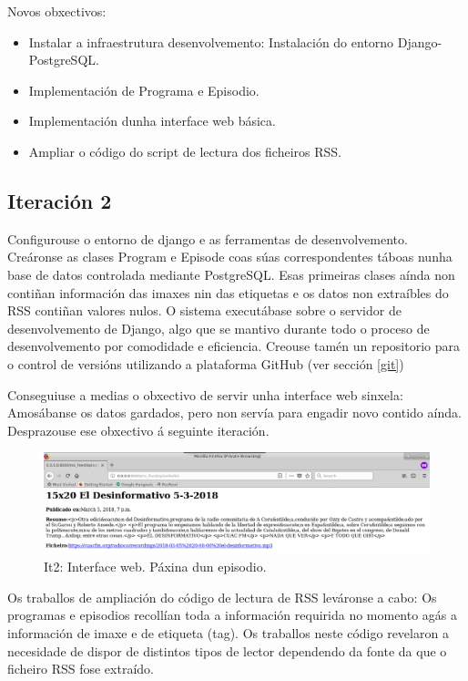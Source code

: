 Novos obxectivos:

\begin{itemize}
	\item Instalar a infraestrutura desenvolvemento: Instalación do entorno Django-PostgreSQL.
	\item Implementación de Programa e Episodio.
	\item Implementación dunha interface web básica.
	\item Ampliar o código do script de lectura dos ficheiros RSS.
\end{itemize}

\subsection{Iteración 2}

Configurouse o entorno de django e as ferramentas de desenvolvemento. Creáronse as clases Program e Episode coas súas correspondentes táboas nunha base de datos controlada mediante PostgreSQL. Esas primeiras clases aínda non contiñan información das imaxes nin das etiquetas e os datos non extraíbles do RSS contiñan valores nulos. O sistema executábase sobre o servidor de desenvolvemento de Django, algo que se mantivo durante todo o proceso de desenvolvemento por comodidade e eficiencia. Creouse tamén un repositorio para o control de versións utilizando a plataforma GitHub (ver sección \ref{git})

Conseguiuse a medias o obxectivo de servir unha interface web sinxela: Amosábanse os datos gardados, pero non servía para engadir novo contido aínda. Desprazouse ese obxectivo á seguinte iteración.

\begin{figure}[h]
	\centering
	\includegraphics[scale=0.3,keepaspectratio=true]{./images/it2_episode.png}
	\caption{It2: Interface web. Páxina dun episodio.}
	\label{fig:it2_episode}
\end{figure}

Os traballos de ampliación do código de lectura de RSS leváronse a cabo: Os programas e episodios recollían toda a información requirida no momento agás a información de imaxe e de etiqueta (tag). Os traballos neste código revelaron a necesidade de dispor de distintos tipos de lector dependendo da fonte da que o ficheiro RSS fose extraído. 

